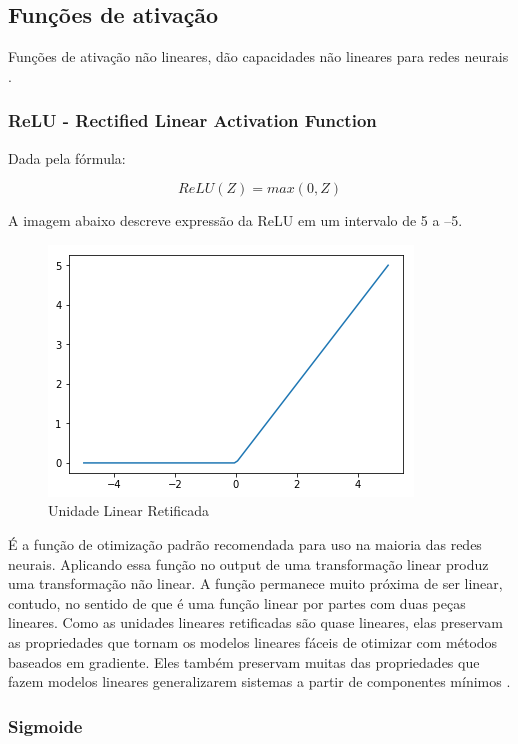 \documentclass[12pt]{article}
\begin{document}
\subsection{Funções de ativação}

Funções de ativação não lineares, dão capacidades não lineares para redes neurais \cite{lecun:98}.

\subsubsection{ReLU - Rectified Linear Activation Function}

Dada pela fórmula:

\begin{equation}
    ReLU(Z) = max(0, Z)
\end{equation}

A imagem abaixo descreve expressão da ReLU em um intervalo de 5 a –5.

\begin{figure}[ht]
\centering
\includegraphics[width=.5\textwidth]{images/relu.png}
\caption{Unidade Linear Retificada}
\label{fig:relu}
\end{figure}

É a função de otimização padrão recomendada para uso na maioria das redes neurais. Aplicando essa função no output de uma transformação linear produz uma transformação não linear. A função permanece muito próxima de ser linear, contudo, no sentido de que é uma função linear por partes com duas peças lineares. Como as unidades lineares retificadas são quase lineares, elas preservam as propriedades que tornam os modelos lineares fáceis de otimizar com métodos baseados em gradiente. Eles também preservam muitas das propriedades que fazem modelos lineares generalizarem sistemas a partir de componentes mínimos \cite{Goodfellow-et-al-2016}.

\subsubsection{Sigmoide}
\end{document}
